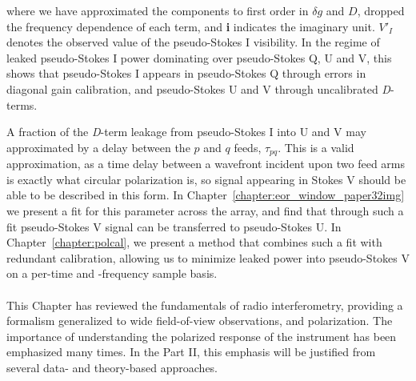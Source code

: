 \begin{table}[h!]
\setcounter{MaxMatrixCols}{4}
\renewcommand\arraystretch{1.25}
\end{table}
where we have approximated the components to first order in $\delta g$ and $D$, dropped the frequency dependence of each term, and \textbf{i} indicates the imaginary unit. $V'_I$ denotes the observed value of the pseudo-Stokes I visibility. In the regime of leaked pseudo-Stokes I power dominating over pseudo-Stokes Q, U and V, this shows that pseudo-Stokes I appears in pseudo-Stokes Q through errors in diagonal gain calibration, and pseudo-Stokes U and V through uncalibrated \textit{D}-terms.

A fraction of the \textit{D}-term leakage from pseudo-Stokes I into U and V may approximated by a delay between the $p$ and $q$ feeds, $\tau_{pq}$. This is a valid approximation, as a time delay between a wavefront incident upon two feed arms is exactly what circular polarization is, so signal appearing in Stokes V should be able to be described in this form. In Chapter~\ref{chapter:eor_window_paper32img} we present a fit for this parameter across the array, and find that through such a fit pseudo-Stokes V signal can be transferred to pseudo-Stokes U. In Chapter~\ref{chapter:polcal}, we present a method that combines such a fit with redundant calibration, allowing us to minimize leaked power into pseudo-Stokes V on a per-time and -frequency sample basis.\\\\

This Chapter has reviewed the fundamentals of radio interferometry, providing a formalism generalized to wide field-of-view observations, and polarization. The importance of understanding the polarized response of the instrument has been emphasized many times. In the Part II, this emphasis will be justified from several data- and theory-based approaches.
